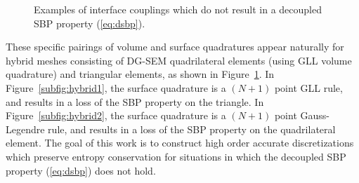 \documentclass[review]{siamart0216}
\theoremstyle{assumption}
\begin{document}
\begin{figure}
\centering
\begingroup
\captionsetup[subfigure]{width=.425\textwidth}
\endgroup
\hspace{2em}
\caption{Examples of interface couplings which do not result in a decoupled SBP property (\ref{eq:dsbp}).  }
\label{fig:hybrid}
\end{figure}

These specific pairings of volume and surface quadratures appear naturally for hybrid meshes consisting of DG-SEM quadrilateral elements (using GLL volume quadrature) and triangular elements, as shown in Figure~\ref{fig:hybrid}.  In Figure~\ref{subfig:hybrid1}, the surface quadrature is a $(N+1)$ point GLL rule, and results in a loss of the SBP property on the triangle.  In Figure~\ref{subfig:hybrid2}, the surface quadrature is a $(N+1)$ point Gauss-Legendre rule, and results in a loss of the SBP property on the quadrilateral element.  The goal of this work is to construct high order accurate discretizations which preserve entropy conservation for situations in which the decoupled SBP property (\ref{eq:dsbp}) does not hold.  
\end{document}
